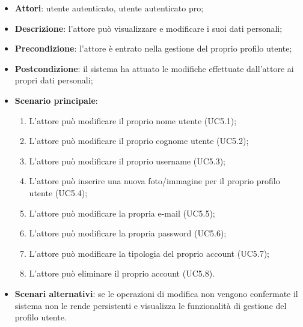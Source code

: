 \begin{itemize}
	\item \textbf{Attori}: utente autenticato, utente autenticato pro;
	\item \textbf{Descrizione}: l'attore può visualizzare e modificare i suoi dati personali;
	\item \textbf{Precondizione}: l'attore è entrato nella gestione del proprio profilo utente;
	\item \textbf{Postcondizione}: il sistema ha attuato le modifiche effettuate dall'attore ai propri dati personali;
	\item \textbf{Scenario principale}:
		\begin{enumerate}
			\item L'attore può modificare il proprio nome utente (UC5.1);
			\item L'attore può modificare il proprio cognome utente (UC5.2);
			\item L'attore può modificare il proprio username (UC5.3);
			\item L'attore può inserire una nuova foto/immagine per il proprio profilo utente (UC5.4);
			\item L'attore può modificare la propria e-mail (UC5.5);
			\item L'attore può modificare la propria password (UC5.6);
			\item L'attore può modificare la tipologia del proprio account (UC5.7);
			\item L'attore può eliminare il proprio account (UC5.8).
		\end{enumerate} 
	\item \textbf{Scenari alternativi}: se le operazioni di modifica non vengono confermate il sistema non le rende persistenti e visualizza le funzionalità di gestione del profilo utente. 
\end{itemize}


